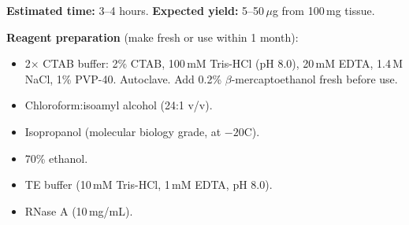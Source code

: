 \begin{protocolbox}[title={Protocol: CTAB DNA Extraction from Plant Tissue}]
\textbf{Estimated time:} 3--4 hours. \textbf{Expected yield:} 5--50\,$\mu$g from 100\,mg tissue.

\textbf{Reagent preparation} (make fresh or use within 1 month):
\begin{itemize}[nosep]
  \item 2$\times$ CTAB buffer: 2\% CTAB, 100\,mM Tris-HCl (pH 8.0), 20\,mM EDTA, 1.4\,M NaCl, 1\% PVP-40. Autoclave. Add 0.2\% $\beta$-mercaptoethanol fresh before use.
  \item Chloroform:isoamyl alcohol (24:1 v/v).
  \item Isopropanol (molecular biology grade, at $-20$\textdegree C).
  \item 70\% ethanol.
  \item TE buffer (10\,mM Tris-HCl, 1\,mM EDTA, pH 8.0).
  \item RNase A (10\,mg/mL).
\end{itemize}


\end{protocolbox}

